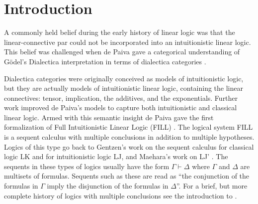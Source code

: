 \documentclass[preprint,6pt]{elsarticle}
\begin{document}
\section{Introduction}
\label{sec:introduction}

A commonly held belief during the early history of linear logic was
that the linear-connective par could not be incorporated into an
intuitionistic linear logic.  This belief was challenged when de Paiva
gave a categorical understanding of G\"odel's Dialectica
interpretation in terms of dialectica categories
\cite{dePaiva:1987,dePaiva:1988}.  

Dialectica categories were originally conceived  as models of
intuitionistic logic, but they are actually models of intuitionistic
linear logic, containing the linear connectives: tensor, implication,
the additives, and the exponentials.  Further work improved de Paiva's
models to capture both intuitionistic and classical linear logic.
Armed with this semantic insight de Paiva gave the first formalization
of Full Intuitionistic Linear Logic (FILL) \cite{dePaiva:1988}. The logical system FILL
is a sequent calculus with multiple conclusions in addition to
multiple hypotheses.  Logics of this type go back to Gentzen's work on
the sequent calculus for classical logic LK and for intuitionistic
logic LJ, and Maehara's work on LJ' \cite{Maehara:1954,Takeuti:1975}.
The sequents in these types of logics usually have the form $\Gamma\vdash \Delta$ where $\Gamma$ and $\Delta$ are multisets of formulas.
Sequents such as these are read as ``the conjunction of the formulas
in $\Gamma$ imply the disjunction of the formulas in $\Delta$''.  For
a brief, but more complete history of logics with multiple conclusions
see the introduction to \cite{dePaiva:2005}.
\end{document}
